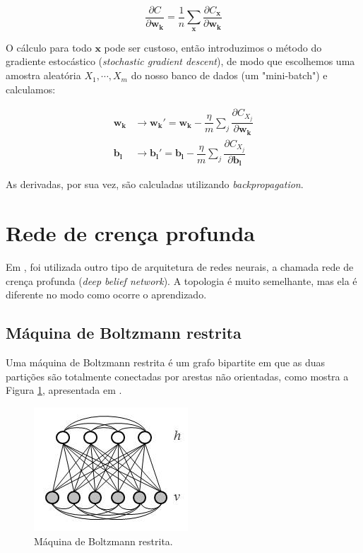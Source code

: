 \documentclass{article}
\begin{document}
            \begin{equation}
                \dfrac{\partial C}{\partial \mathbf{w_k}} = \dfrac{1}{n} \sum_{\mathbf{x}} \dfrac{\partial C_{\mathbf{x}}}{\partial \mathbf{w_k}}
            \end{equation}
            
            O cálculo para todo $\mathbf{x}$ pode ser custoso, então introduzimos o método do gradiente estocástico (\textit{stochastic gradient descent}), de modo que escolhemos uma amostra aleatória $X_1, \cdots, X_m$ do nosso banco de dados (um "mini-batch") e calculamos:

            \begin{equation}
                \begin{split}
                    \mathbf{w_k} &\rightarrow \mathbf{w_k'} = \mathbf{w_k} - \dfrac{\eta}{m} \sum_j \dfrac{\partial C_{X_j}}{\partial \mathbf{w_k}} \\
                    \mathbf{b_l} &\rightarrow \mathbf{b_l'} = \mathbf{b_l} - \dfrac{\eta}{m} \sum_j \dfrac{\partial C_{X_j}}{\partial \mathbf{b_l}}
                \end{split}
            \end{equation}

            As derivadas, por sua vez, são calculadas utilizando \textit{backpropagation}.

    \section{Rede de crença profunda}

        Em \cite{testolin2018deep}, foi utilizada outro tipo de arquitetura de redes neurais, a chamada rede de crença profunda (\textit{deep belief network}).
        A topologia é muito semelhante, mas ela é diferente no modo como ocorre o aprendizado.

        \subsection{Máquina de Boltzmann restrita}

            Uma máquina de Boltzmann restrita é um grafo bipartite em que as duas partições são totalmente conectadas por arestas não orientadas, como mostra a Figura \ref{fig3}, apresentada em \cite{testolin2018deep}.

            \begin{figure}[h!]
                \centering
                \includegraphics[scale=0.5]{Images/Restricted Boltzmann machine.png}
                \caption{Máquina de Boltzmann restrita.}
                \label{fig3}
            \end{figure}
\end{document}
